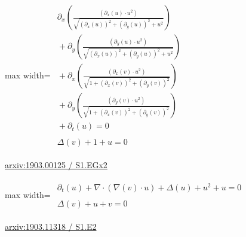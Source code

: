 \documentclass[UTF8,10pt,a4paper,fontset=mac]{ctexart}
\begin{document}
\begin{minipage}{\linewidth}\begin{center}\begin{adjustbox}{max width=\linewidth}$\displaystyle\begin{gathered}\begin{gathered}\partial_{x}(\frac{(\partial_{x}(u)\cdot u^{2})}{\sqrt{(\partial_{x}(u))^{2}+(\partial_{y}(u))^{2}+u^{2}}})\\[-1pt]{}+\partial_{y}(\frac{(\partial_{y}(u)\cdot u^{2})}{\sqrt{(\partial_{x}(u))^{2}+(\partial_{y}(u))^{2}+u^{2}}})\\[-1pt]{}+\partial_{x}(\frac{(\partial_{x}(v)\cdot u^{2})}{\sqrt{1+(\partial_{x}(v))^{2}+(\partial_{y}(v))^{2}}})\\[-1pt]{}+\partial_{y}(\frac{(\partial_{y}(v)\cdot u^{2})}{\sqrt{1+(\partial_{x}(v))^{2}+(\partial_{y}(v))^{2}}})\\[-1pt]{}+\partial_{t}(u)=0\end{gathered}\\[5pt]\begin{gathered}\Delta(v)+1+u=0\end{gathered}\end{gathered}$\end{adjustbox}\end{center}{\small\href{https://arxiv.org/html/1903.00125#S1.EGx2}{arxiv:1903.00125 / S1.EGx2}}\par\end{minipage}\par\vspace{6mm}

\begin{minipage}{\linewidth}\begin{center}\begin{adjustbox}{max width=\linewidth}$\displaystyle\begin{gathered}\begin{gathered}\partial_{t}(u)+\nabla\cdot(\nabla(v)\cdot u)+\Delta(u)+u^{2}+u=0\end{gathered}\\[5pt]\begin{gathered}\Delta(v)+u+v=0\end{gathered}\end{gathered}$\end{adjustbox}\end{center}{\small\href{https://arxiv.org/html/1903.11318#S1.E2}{arxiv:1903.11318 / S1.E2}}\par\end{minipage}\par\vspace{6mm}
\end{document}
